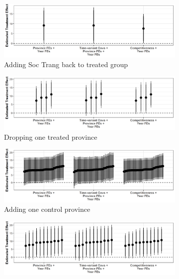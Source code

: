 \documentclass[12pt]{article}
\newcommand{\1}{\mathbbm{1}}
\begin{document}
\begin{figure}[!htbp]
	\centering
	\begin{subfigure}{.8\textwidth}
		\centering
		\includegraphics[width=\textwidth]{figure/200423_perturb_results_treat_add.png}
		\captionsetup{singlelinecheck=off, justification=centering}
		\caption{Adding Soc Trang back to treated group}
	\end{subfigure}
	\begin{subfigure}{.8\textwidth}
		\centering
		\includegraphics[width=\textwidth]{figure/200423_perturb_results_treat_drop.png}
		\captionsetup{singlelinecheck=off, justification=centering}
		\caption{Dropping one treated province}
	\end{subfigure}
	\begin{subfigure}{.8\textwidth}
		\centering
		\includegraphics[width=\textwidth]{figure/200423_perturb_results_control_add.png}
		\captionsetup{singlelinecheck=off, justification=centering}
		\caption{Adding one control province}
	\end{subfigure}
	\begin{subfigure}{.8\textwidth}
		\centering
		\includegraphics[width=\textwidth]{figure/200423_perturb_results_control_drop.png}

\end{subfigure}
\end{figure}
\end{document}
